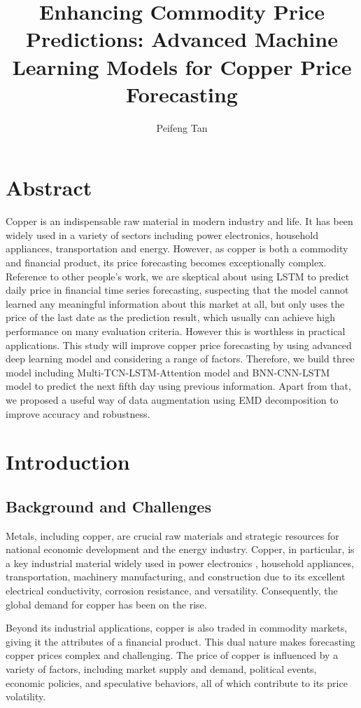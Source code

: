 \documentclass[final-report]{report-template}
\title{Enhancing Commodity Price Predictions: Advanced Machine Learning Models for Copper Price Forecasting}
\author{Peifeng Tan}
\begin{document}
\maketitlepage  %

\section*{Abstract}
Copper is an indispensable raw material in modern industry and life. It has been widely used in a variety of sectors including power electronics, household appliances, transportation and energy. However, as copper is both a commodity and financial product, its price forecasting becomes  exceptionally complex. Reference to other people's work, we are skeptical about using LSTM to predict daily price in financial time series forecasting, suspecting that the model cannot learned any meaningful information about this market at all, but only uses the price of the last date as the prediction result, which usually can achieve high performance on many evaluation criteria. However this is worthless in practical applications. This study will improve copper price forecasting by using advanced deep learning model and considering a range of factors. Therefore, we build three model including Multi-TCN-LSTM-Attention model and BNN-CNN-LSTM model to predict the next fifth day using previous information. Apart from that, we proposed a useful way of data augmentation using EMD decomposition to improve accuracy and robustness. 
\section{Introduction}
\subsection{Background and Challenges}
Metals, including copper, are crucial raw materials and strategic resources for national economic development and the energy industry. Copper, in particular, is a key industrial material widely used in power electronics \cite{sun2018freezing} , household appliances, transportation, machinery manufacturing, and construction due to its excellent electrical conductivity, corrosion resistance, and versatility. Consequently, the global demand for copper has been on the rise.

Beyond its industrial applications, copper is also traded in commodity markets, giving it the attributes of a financial product.\cite{frankel2010determinants,behmiri2015role} This dual nature makes forecasting copper prices complex and challenging. The price of copper is influenced by a variety of factors, \cite{BUNCIC20151}including market supply and demand, political events, economic policies, and speculative behaviors, all of which contribute to its price volatility.
\end{document}
